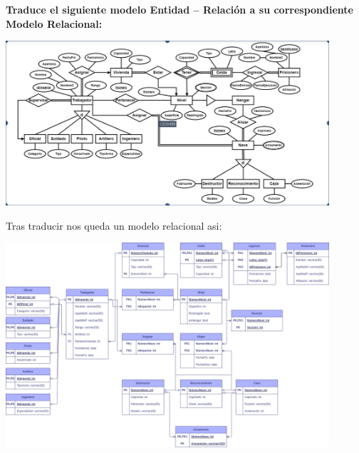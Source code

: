 \textbf{Traduce el siguiente modelo Entidad – Relación a su correspondiente Modelo Relacional:}\vspace{.3cm}

\begin{center}
    \includegraphics[width=12cm]{conversion/../resources/a.png}
\end{center}

Tras traducir nos queda un modelo relacional asi:

\begin{center}
    \includegraphics[width=12cm]{conversion/../resources/Tarea3.2.a.drawio.png}
\end{center}

\vspace{.5cm}